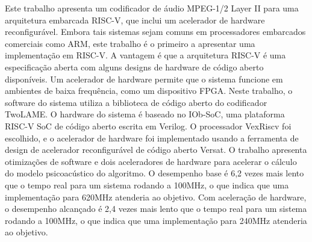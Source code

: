 \hspace{0.4cm} Este trabalho apresenta um codificador de áudio MPEG-1/2 Layer II para uma arquitetura embarcada RISC-V, que inclui um acelerador de hardware reconfigurável. Embora tais sistemas sejam comuns em processadores embarcados comerciais como ARM, este trabalho é o primeiro a apresentar uma implementação em RISC-V. A vantagem é que a arquitetura RISC-V é uma especificação aberta com alguns designs de hardware de código aberto disponíveis. Um acelerador de hardware permite que o sistema funcione em ambientes de baixa frequência, como um dispositivo FPGA. Neste trabalho, o software do sistema utiliza a biblioteca de código aberto do codificador TwoLAME. O hardware do sistema é baseado no IOb-SoC, uma plataforma RISC-V SoC de código aberto escrita em Verilog. O processador VexRiscv foi escolhido, e o acelerador de hardware foi implementado usando a ferramenta de design de acelerador reconfigurável de código aberto Versat. O trabalho apresenta otimizações de software e dois aceleradores de hardware para acelerar o cálculo do modelo psicoacústico do algoritmo. O desempenho base é 6,2 vezes mais lento que o tempo real para um sistema rodando a 100MHz, o que indica que uma implementação para 620MHz atenderia ao objetivo. Com aceleração de hardware, o desempenho alcançado é 2,4 vezes mais lento que o tempo real para um sistema rodando a 100MHz, o que indica que uma implementação para 240MHz atenderia ao objetivo.
